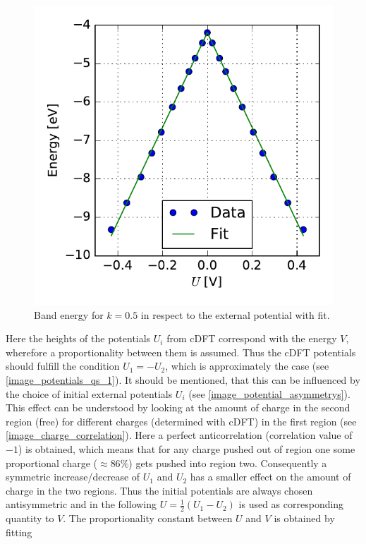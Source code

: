 \begin{figure}
\begin{minipage}{0.49\textwidth}
	\end{minipage}\hspace*{.5cm}
	\begin{minipage}{0.49\textwidth}
	\centering
	\includegraphics[width = \textwidth]{Images/Hydrogen/charging/border_energy_q_1}
	\caption{Band energy for $k = 0.5$ in respect to the external potential with fit.}
	\label{image_edge_energy_qs_1}
	\end{minipage}
\end{figure}
Here the heights of the potentials $U_i$ from cDFT correspond with the energy $V$, wherefore a proportionality between them is assumed. Thus the cDFT potentials should fulfill the condition $U_1 = - U_2$, which is approximately the case (see \cref{image_potentials_qs_1}). It should be mentioned, that this can be influenced by the choice of initial external potentials $U_i$ (see \cref{image_potential_asymmetrys}). This effect can be understood by looking at the amount of charge in the second region (free) for different charges (determined with cDFT) in the first region (see \cref{image_charge_correlation}). Here a perfect anticorrelation (correlation value of $-1$) is obtained, which means that for any charge pushed out of region one some proportional charge ($\approx 86\%$) gets pushed into region two. Consequently a symmetric increase/decrease of $U_1$ and $U_2$ has a smaller effect on the amount of charge in the two regions. Thus the initial potentials are always chosen antisymmetric and in the following $U = \frac{1}{2}(U_1 - U_2)$ is used as corresponding quantity to $V$. The proportionality constant between $U$ and $V$ is obtained by fitting

